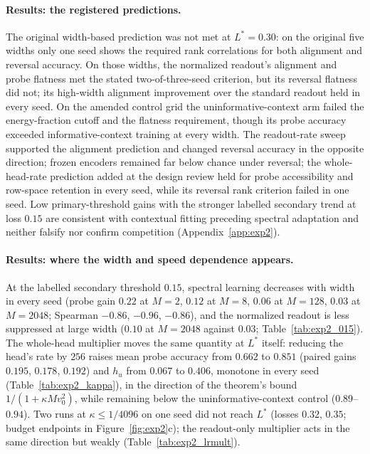 \paragraph{Results: the registered predictions.}
The original width-based prediction was not met at $L^\ast=0.30$: on the
original five widths only one seed shows the required rank correlations
for both alignment and reversal accuracy. On those widths, the normalized
readout's alignment and probe flatness met the stated two-of-three-seed
criterion, but its reversal flatness did not; its high-width alignment
improvement over the standard readout held in every seed. On the amended
control grid the uninformative-context arm failed the energy-fraction
cutoff and the flatness requirement, though its probe accuracy exceeded
informative-context training at every width.
The readout-rate sweep supported the alignment prediction and changed
reversal accuracy in the opposite direction; frozen encoders remained far
below chance under reversal; the whole-head-rate prediction added at the
design review held for probe accessibility and row-space retention in
every seed, while its reversal rank criterion failed in one seed. Low
primary-threshold gains with the stronger labelled secondary trend at loss
$0.15$ are consistent with contextual fitting preceding spectral
adaptation and neither falsify nor confirm competition
(Appendix~\ref{app:exp2}).

\paragraph{Results: where the width and speed dependence appears.}
At the labelled secondary threshold $0.15$, spectral learning decreases
with width in every seed (probe gain $0.22$ at $M=2$, $0.12$ at $M=8$,
$0.06$ at $M=128$, $0.03$ at $M=2048$; Spearman $-0.86$, $-0.96$, $-0.86$),
and the normalized readout is less suppressed at large width ($0.10$ at
$M=2048$ against $0.03$; Table~\ref{tab:exp2_015}). The whole-head
multiplier moves the same quantity at $L^\ast$ itself: reducing the head's
rate by $256$ raises mean probe accuracy from $0.662$ to $0.851$ (paired
gains $0.195$, $0.178$, $0.192$) and $h_u$ from $0.067$ to $0.406$, monotone
in every seed (Table~\ref{tab:exp2_kappa}), in the direction of the
theorem's bound $1/(1+\kappa Mv_0^2)$, while remaining below the
uninformative-context control ($0.89$--$0.94$). Two runs at
$\kappa\le1/4096$ on one seed did not reach $L^\ast$ (losses $0.32$,
$0.35$; budget endpoints in Figure~\ref{fig:exp2}c); the readout-only
multiplier acts in the same direction but weakly
(Table~\ref{tab:exp2_lrmult}).

